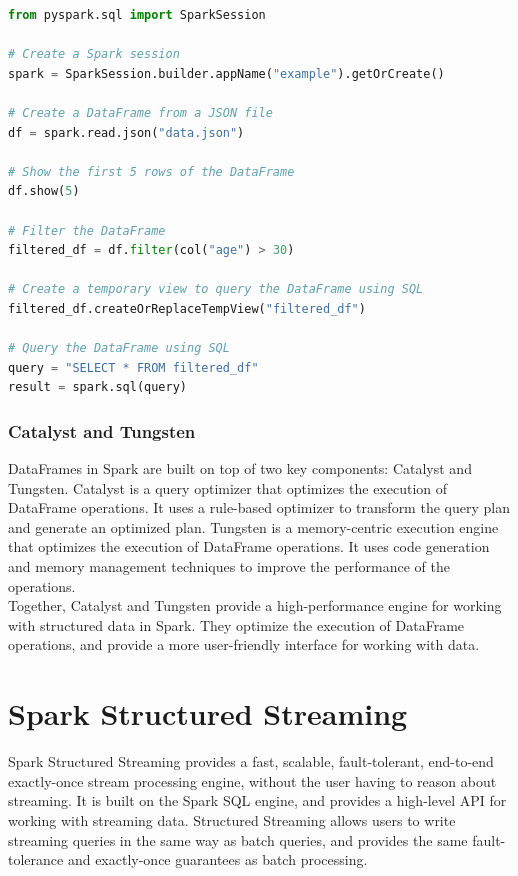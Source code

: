 \begin{lstlisting}[language=Python]
from pyspark.sql import SparkSession

# Create a Spark session
spark = SparkSession.builder.appName("example").getOrCreate()

# Create a DataFrame from a JSON file
df = spark.read.json("data.json")

# Show the first 5 rows of the DataFrame
df.show(5)

# Filter the DataFrame
filtered_df = df.filter(col("age") > 30)

# Create a temporary view to query the DataFrame using SQL
filtered_df.createOrReplaceTempView("filtered_df")

# Query the DataFrame using SQL
query = "SELECT * FROM filtered_df"
result = spark.sql(query)
\end{lstlisting}

\subsubsection{Catalyst and Tungsten}

DataFrames in Spark are built on top of two key components: Catalyst and Tungsten. Catalyst is a query
optimizer that optimizes the execution of DataFrame operations. It uses a rule-based optimizer to
transform the query plan and generate an optimized plan. Tungsten is a memory-centric execution engine
that optimizes the execution of DataFrame operations. It uses code generation and memory management
techniques to improve the performance of the operations.\\

Together, Catalyst and Tungsten provide a high-performance engine for working with structured data in
Spark. They optimize the execution of DataFrame operations, and provide a more user-friendly interface
for working with data.

\section{Spark Structured Streaming}

Spark Structured Streaming provides a fast, scalable, fault-tolerant, end-to-end exactly-once stream
processing engine, without the user having to reason about streaming. It is built on the Spark SQL
engine, and provides a high-level API for working with streaming data. Structured Streaming allows
users to write streaming queries in the same way as batch queries, and provides the same fault-tolerance
and exactly-once guarantees as batch processing.

